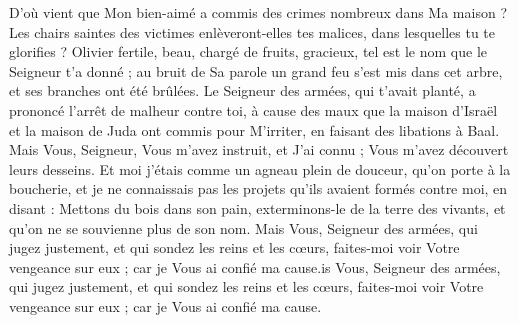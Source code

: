D'où vient que Mon bien-aimé a commis des crimes nombreux dans Ma maison ? Les chairs saintes des victimes enlèveront-elles tes malices, dans lesquelles tu te glorifies ?
Olivier fertile, beau, chargé de fruits, gracieux, tel est le nom que le Seigneur t'a donné ; au bruit de Sa parole un grand feu s'est mis dans cet arbre, et ses branches ont été brûlées.
Le Seigneur des armées, qui t'avait planté, a prononcé l'arrêt de malheur contre toi, à cause des maux que la maison d'Israël et la maison de Juda ont commis pour M'irriter, en faisant des libations à Baal.
Mais Vous, Seigneur, Vous m'avez instruit, et J'ai connu ; Vous m'avez découvert leurs desseins.
Et moi j'étais comme un agneau plein de douceur, qu'on porte à la boucherie, et je ne connaissais pas les projets qu'ils avaient formés contre moi, en disant : Mettons du bois dans son pain, exterminons-le de la terre des vivants, et qu'on ne se souvienne plus de son nom.
Mais Vous, Seigneur des armées, qui jugez justement, et qui sondez les reins et les cœurs, faites-moi voir Votre vengeance sur eux ; car je Vous ai confié ma cause.is Vous, Seigneur des armées, qui jugez justement, et qui sondez les reins et les cœurs, faites-moi voir Votre vengeance sur eux ; car je Vous ai confié ma cause.

